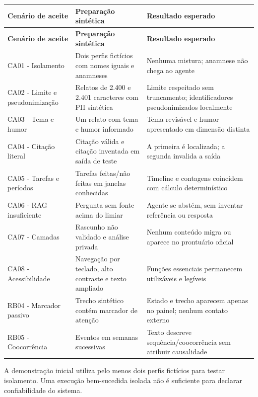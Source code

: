 \documentclass[11pt,a4paper]{article}
\begin{document}
\begingroup\small
\begin{longtable}{>{\raggedright\arraybackslash}p{}>{\raggedright\arraybackslash}p{}>{\raggedright\arraybackslash}p{}}
\toprule
\textbf{Cenário de aceite} & \textbf{Preparação sintética} & \textbf{Resultado esperado} \\ \midrule\endfirsthead
\toprule
\textbf{Cenário de aceite} & \textbf{Preparação sintética} & \textbf{Resultado esperado} \\ \midrule\endhead
\bottomrule\endfoot
CA01 - Isolamento & Dois perfis fictícios com nomes iguais e anamneses & Nenhuma mistura; anamnese não chega ao agente \\[3pt]
CA02 - Limite e pseudonimização & Relatos de 2.400 e 2.401 caracteres com PII sintética & Limite respeitado sem truncamento; identificadores pseudonimizados localmente \\[3pt]
CA03 - Tema e humor & Um relato com tema e humor informado & Tema revisável e humor apresentado em dimensão distinta \\[3pt]
CA04 - Citação literal & Citação válida e citação inventada em saída de teste & A primeira é localizada; a segunda invalida a saída \\[3pt]
CA05 - Tarefas e períodos & Tarefas feitas/não feitas em janelas conhecidas & Timeline e contagens coincidem com cálculo determinístico \\[3pt]
CA06 - RAG insuficiente & Pergunta sem fonte acima do limiar & Agente se abstém, sem inventar referência ou resposta \\[3pt]
CA07 - Camadas & Rascunho não validado e análise privada & Nenhum conteúdo migra ou aparece no prontuário oficial \\[3pt]
CA08 - Acessibilidade & Navegação por teclado, alto contraste e texto ampliado & Funções essenciais permanecem utilizáveis e legíveis \\[3pt]
RB04 - Marcador passivo & Trecho sintético contém marcador de atenção & Estado e trecho aparecem apenas no painel; nenhum contato externo \\[3pt]
RB05 - Coocorrência & Eventos em semanas sucessivas & Texto descreve sequência/coocorrência sem atribuir causalidade \\[3pt]
\end{longtable}
\endgroup
A demonstração inicial utiliza pelo menos dois perfis fictícios para testar isolamento. Uma execução bem-sucedida isolada não é suficiente para declarar confiabilidade do sistema.
\end{document}
